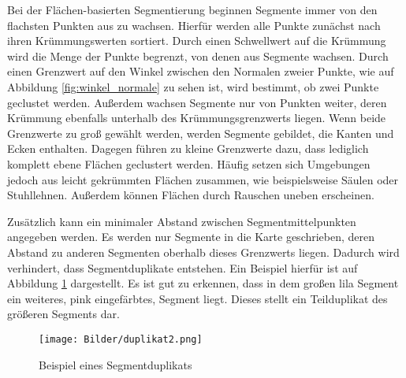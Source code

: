 Bei der Flächen-basierten Segmentierung beginnen Segmente immer von den flachsten Punkten aus zu wachsen. Hierfür werden alle Punkte zunächst nach ihren Krümmungswerten sortiert. Durch einen Schwellwert auf die Krümmung wird die Menge der Punkte begrenzt, von denen aus Segmente wachsen. Durch einen Grenzwert auf den Winkel zwischen den Normalen zweier Punkte, wie auf Abbildung \ref{fig:winkel_normale} zu sehen ist, wird bestimmt, ob zwei Punkte geclustet werden. Außerdem wachsen Segmente nur von Punkten weiter, deren Krümmung ebenfalls unterhalb des Krümmungsgrenzwerts liegen. Wenn beide Grenzwerte zu groß gewählt werden, werden Segmente gebildet, die Kanten und Ecken enthalten. Dagegen führen zu kleine Grenzwerte dazu, dass lediglich komplett ebene Flächen geclustert werden. Häufig setzen sich Umgebungen jedoch aus leicht gekrümmten Flächen zusammen, wie beispielsweise Säulen oder Stuhllehnen. Außerdem können Flächen durch Rauschen uneben erscheinen. 

%
%
Zusätzlich kann ein minimaler Abstand zwischen Segmentmittelpunkten angegeben werden. Es werden nur Segmente in die Karte geschrieben, deren Abstand zu anderen Segmenten oberhalb dieses Grenzwerts liegen. Dadurch wird verhindert, dass Segmentduplikate entstehen. Ein Beispiel hierfür ist auf Abbildung \ref{fig:Duplikat} dargestellt. Es ist gut zu erkennen, dass in dem großen lila Segment ein weiteres, pink eingefärbtes, Segment liegt. Dieses stellt ein Teilduplikat des größeren Segments dar.

\begin{figure}
	\centering
	\texttt{[image: Bilder/duplikat2.png]}
	\caption{Beispiel eines Segmentduplikats}
	\label{fig:Duplikat}
\end{figure}

